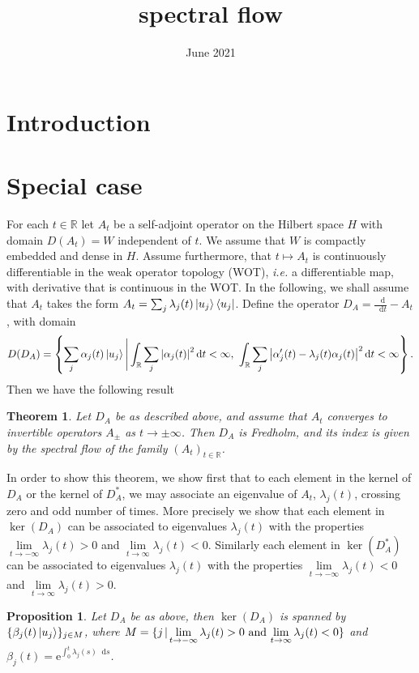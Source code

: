 \documentclass[a4paper,11pt]{article}
\title{spectral flow}
\author{ }
\date{June 2021}
\newcommand{\euler}[1]{\text{e}^{#1}}
\newcommand{\abs}[1]{\left\lvert #1 \right\rvert}
\newcommand*\diff{\mathop{}\!\mathrm{d}}
\newcommand{\ie}{\emph{i.e.} }
\newcommand{\R}{\mathbb{R}}
\newcommand{\pipe}{\hspace{.5mm}|\hspace{.5mm}}
\newtheorem{theorem}{Theorem}
\newtheorem{proposition}{Proposition}
\begin{document}
\maketitle

\section{Introduction}
\section{Special case}
For each $ t\in\R $ let $ A_t $ be a self-adjoint operator on the Hilbert space $ H $ with domain $ D(A_t)=W $ independent of $ t $. We assume that $ W $ is compactly embedded and dense in $ H $. Assume furthermore, that $ t\mapsto A_t $ is continuously differentiable in the weak operator topology (WOT), \ie a differentiable map, with derivative that is continuous in the WOT. In the following, we shall assume that $ A_t $ takes the form $ A_t=\sum_{j} \lambda_j(t)\ket{u_j}\bra{u_j} $. Define the operator $ D_A=\frac{\diff}{\diff t}-A_t $, with domain \begin{equation*}
D(D_A)=\left\{\sum_{j}\alpha_j(t)\ket{u_j}\Bigg\vert \int_{\R}\sum_{j}\abs{\alpha_j(t)}^2\diff t<\infty,\ \int_{\R}\sum_{j}\abs{\alpha_j'(t)-\lambda_j(t)\alpha_j(t)}^2\diff t<\infty\right\}.
\end{equation*}
Then we have the following result \begin{theorem}
	Let $ D_A $ be as described above, and assume that $ A_t $ converges to invertible operators $ A_\pm $ as $ t\to\pm\infty $. Then $ D_A $ is Fredholm, and its index is given by the spectral flow of the family $ (A_t)_{t\in\R} $.
\end{theorem}
In order to show this theorem, we show first that to each element in the kernel of $ D_A $ or the kernel of $ D_A^* $, we may associate an eigenvalue of $A_t $, $ \lambda_j(t) $, crossing zero and odd number of times. More precisely we show that each element in $ \ker(D_A) $ can be associated to eigenvalues $ \lambda_j(t) $ with the properties $ \lim\limits_{t\to-\infty}\lambda_j(t)>0 $ and $ \lim\limits_{t\to\infty}\lambda_j(t)<0 $. Similarly each element in $ \ker(D_A^*) $ can be associated to eigenvalues $ \lambda_j(t) $ with the properties $ \lim\limits_{t\to-\infty}\lambda_j(t)<0 $ and $ \lim\limits_{t\to\infty}\lambda_j(t)>0 $.
\begin{proposition}\label{Prop1}
	Let $ D_A $ be as above, then $ \ker(D_A) $ is spanned by $ \{\beta_j(t)\ket{u_j}\}_{j\in M} $, where $ M=\{j\pipe \text{$ \lim\limits_{t\to-\infty}\lambda_j(t)>0 $ and $ \lim\limits_{t\to\infty}\lambda_j(t)<0 $} \} $ and $ \beta_j(t)=\euler{\int_{0}^{t}\lambda_j(s)\diff s} $.
\end{proposition}
\end{document}
